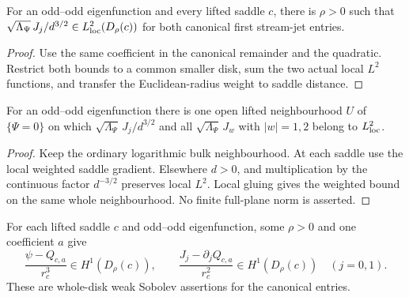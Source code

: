 \begin{lemma}
\label{lem:dd-log-saddle-gradient}
\leanok
For an odd--odd eigenfunction and every lifted saddle $c$, there is $\rho>0$
such that $\sqrt{\Lambda_\Psi}\,J_j/d^{3/2}\in L^2_{\rm loc}(D_\rho(c))$
for both canonical first stream-jet entries.
\end{lemma}

\begin{proof}
\leanok
Use the same coefficient in the canonical remainder and the quadratic.
Restrict both bounds to a common smaller disk, sum the two actual local
$L^2$ functions, and transfer the Euclidean-radius weight to saddle distance.
\end{proof}

\begin{lemma}
\label{lem:dd-log-bulk}
\leanok
For an odd--odd eigenfunction there is one open lifted neighbourhood $U$ of
$\{\Psi=0\}$ on which
$\sqrt{\Lambda_\Psi}\,J_j/d^{3/2}$ and all
$\sqrt{\Lambda_\Psi}\,J_w$ with $|w|=1,2$ belong to $L^2_{\rm loc}$.
\end{lemma}

\begin{proof}
\leanok
Keep the ordinary logarithmic bulk neighbourhood. At each saddle use the
local weighted saddle gradient. Elsewhere $d>0$, and multiplication by
the continuous factor $d^{-3/2}$ preserves local $L^2$.
Local gluing gives the weighted bound on the same whole neighbourhood.
No finite full-plane norm is asserted.
\end{proof}

\begin{lemma}
\label{lem:dd-saddle-ray-quotients-h1}
\leanok
For each lifted saddle $c$ and odd--odd eigenfunction, some $\rho>0$
and one coefficient $a$ give
\[
 \frac{\psi-Q_{c,a}}{r_c^3}\in H^1(D_\rho(c)),\qquad
 \frac{J_j-\partial_jQ_{c,a}}{r_c^2}\in H^1(D_\rho(c))
 \quad(j=0,1).
\]
These are whole-disk weak Sobolev assertions for the canonical entries.
\end{lemma}

